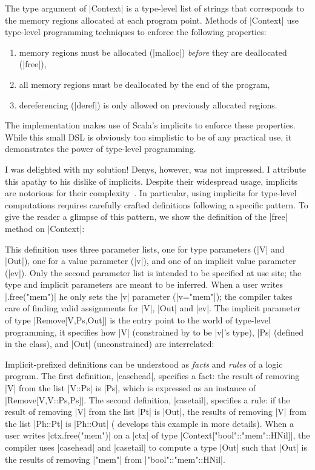 \memImplicitMain

\noindent
The type argument of |Context| is a type-level list of strings that corresponds to the memory regions allocated at each program point.
Methods of |Context| use type-level programming techniques to enforce the following properties:

\begin{enumerate}
  \item memory regions must be allocated (|malloc|) \emph{before} they are deallocated (|free|),
  \item all memory regions must be deallocated by the end of the program,
  \item dereferencing (|deref|) is only allowed on previously allocated regions.
\end{enumerate}

\noindent
The implementation makes use of Scala's implicits to enforce these properties.
While this small DSL is obviously too simplistic to be of any practical use, it demonstrates the power of type-level programming.

I was delighted with my solution!
Denys, however, was not impressed.
I attribute this apathy to his dislike of implicits.
Despite their widespread usage, implicits are notorious for their complexity~\citep{kvrikava2019scala}.
In particular, using implicits for type-level computations requires carefully crafted definitions following a specific pattern.
To give the reader a glimpse of this pattern, we show the definition of the |free| method on |Context|:

\memImplicitContextFree

\noindent
This definition uses three parameter lists, one for type parameters (|V| and |Out|), one for a value parameter (|v|), and one of an implicit value parameter (|ev|).
Only the second parameter list is intended to be specified at use site; the type and implicit parameters are meant to be inferred.
When a user writes |.free("mem")| he only sets the |v| parameter (|v="mem"|); the compiler takes care of finding valid assignments for |V|, |Out| and |ev|.
The implicit parameter of type |Remove[V,Ps,Out]| is the entry point to the world of type-level programming, it specifies how |V| (constrained by to be |v|'s type), |Ps| (defined in the class), and |Out| (unconstrained) are interrelated:

\memImplicitRemove

\noindent
Implicit-prefixed definitions can be understood as \emph{facts} and \emph{rules} of a logic program.
The first definition, |casehead|, specifies a fact: the result of removing |V| from the list |V::Ps| is |Ps|, which is expressed as an instance of |Remove[V,V::Ps,Ps]|.
The second definition, |casetail|, specifies a rule: if the result of removing |V| from the list |Pt| is |Out|, the results of removing |V| from the list |Ph::Pt| is |Ph::Out| ( develops this example in more details).
When a user writes |ctx.free("mem")| on a |ctx| of type |Context["bool"::"mem"::HNil]|, the compiler uses |casehead| and |casetail| to compute a type |Out| such that |Out| is the results of removing |"mem"| from |"bool"::"mem"::HNil|.

